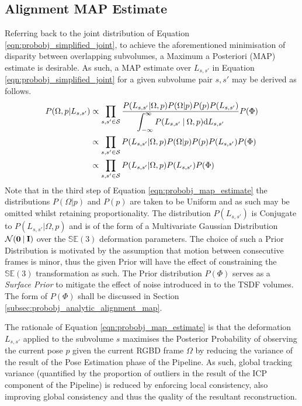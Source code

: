 \subsection{Alignment MAP Estimate}
\label{subsec:probobj_alignment_map}
Referring back to the joint distribution of Equation
\ref{eqn:probobj_simplified_joint}, to achieve the aforementioned minimisation
of disparity between overlapping subvolumes, a Maximum a Posteriori (MAP)
estimate is desirable. As such, a MAP estimate over $L_{s, s'}$ in Equation
\ref{eqn:probobj_simplified_joint} for a given subvolume pair $s, s'$ may be
derived as follows.
\begin{align}
  \label{eqn:probobj_map_estimate}
  P(\Omega, p | L_{s, s'}) & \propto \prod_{s, s' \in \mathcal{S}}
  \frac{P(L_{s, s'} | \Omega, p) 
  P(\Omega | p)P(p)P(L_{s, s'})}
  {\displaystyle\int_{-\infty}^{\infty} P(L_{s, s'} \:\vert\: \Omega, p)
  {\mathrm d{L_{s, s'}}}} P(\Phi) \\
  & \propto \prod_{s, s' \in \mathcal{S}} P(L_{s, s'} | \Omega, p) P(\Omega | p)
  P(p)P(L_{s, s'})P(\Phi) \\
  & \propto \prod_{s, s' \in \mathcal{S}} P(L_{s, s'} | \Omega, p)P(L_{s, s'})
  P(\Phi)
\end{align}
Note that in the third step of Equation \ref{eqn:probobj_map_estimate} the
distributions $P(\Omega | p)$ and $P(p)$ are taken to be Uniform and as such may
be omitted whilst retaining proportionality. The distribution $P(L_{s, s'})$ is
Conjugate to $P(L_{s, s'} | \Omega, p)$ and is of the form of a Multivariate
Gaussian Distribution $\mathcal{N}(\mathbf{0} \:\vert\: \mathbf{I})$ over the
$\mathbb{SE}(3)$ deformation parameters. The choice of such a Prior Distribution
is motivated by the assumption that motion between consecutive frames is minor,
thus the given Prior will have the effect of constraining the $\mathbb{SE}(3)$
transformation as such. The Prior distribution $P(\Phi)$ serves as a
\textit{Surface Prior} to mitigate the effect of noise introduced in to the TSDF
volumes. The form of $P(\Phi)$ shall be discussed in Section
\ref{subsec:probobj_analytic_alignment_map}.

The rationale of Equation \ref{eqn:probobj_map_estimate} is that the deformation
$L_{s, s'}$ applied to the subvolume $s$ maximises the Posterior Probability of
observing the current pose $p$ given the current RGBD frame $\Omega$ by reducing
the variance of the result of the Pose Estimation phase of the Pipeline. As such,
global tracking variance (quantified by the proportion of outliers in the result
of the ICP component of the Pipeline) is reduced by enforcing local consistency,
also improving global consistency and thus the quality of the resultant
reconstruction.

